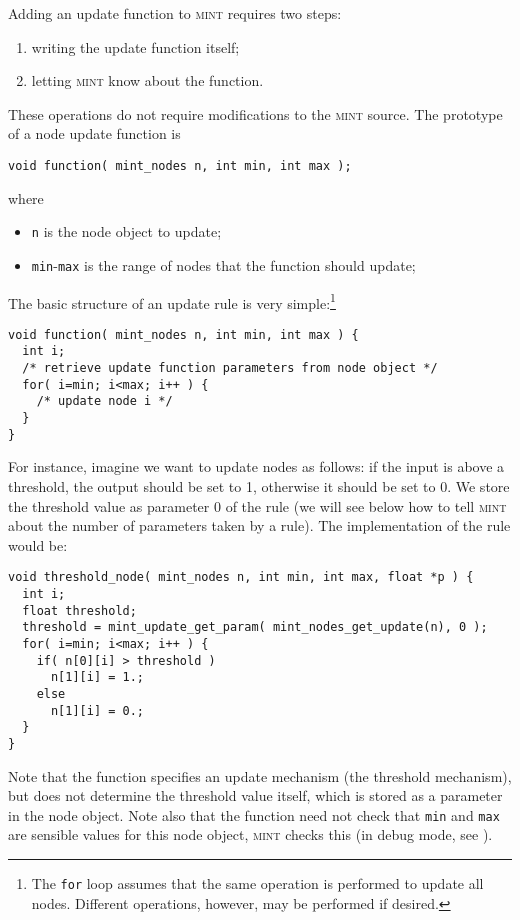 \documentclass[11pt,letterpaper]{memoir}
\let\fref\relax%
\newcommand{\mint}{{\scshape\sffamily mint}\xspace}
\begin{document}
Adding an update function to \mint requires two steps:
\begin{enumerate}
\item writing the update function itself;
\item letting \mint know about the function.
\end{enumerate}
These operations do not require modifications to the \mint source.
The prototype of a node update function is
\begin{lstlisting}
void function( mint_nodes n, int min, int max );
\end{lstlisting}
where
\begin{itemize}
\item \lstinline{n} is the node object to update;
\item \lstinline{min}-\lstinline{max} is the range of nodes that the
  function should update;
\end{itemize}
The basic structure of an  update rule is very simple:\footnote{The
  \lstinline{for} loop assumes that the same operation is performed to
update all nodes. Different operations, however, may be performed if
desired.}
\begin{lstlisting}
void function( mint_nodes n, int min, int max ) {
  int i;
  /* retrieve update function parameters from node object */
  for( i=min; i<max; i++ ) {
    /* update node i */
  }
}  
\end{lstlisting}
For instance, imagine we want to update nodes as follows: if the input
is above a threshold, the output should be set to 1, otherwise it
should be set to 0. We store the threshold value as parameter 0 of the
rule (we will see below how to tell \mint about the number of
parameters taken by a rule). The implementation of the rule would be:
\begin{lstlisting}
void threshold_node( mint_nodes n, int min, int max, float *p ) {
  int i;
  float threshold;
  threshold = mint_update_get_param( mint_nodes_get_update(n), 0 );
  for( i=min; i<max; i++ ) {
    if( n[0][i] > threshold )
      n[1][i] = 1.;
    else
      n[1][i] = 0.;
  }
}  
\end{lstlisting}
Note that the function specifies an update mechanism (the threshold
mechanism), but does not determine the threshold value itself, which
is stored as a parameter in the node object.  Note also that the
function need not check that \lstinline{min} and \lstinline{max} are
sensible values for this node object, \mint checks this (in debug
mode, see \fref{sec:debugging}).
\end{document}
